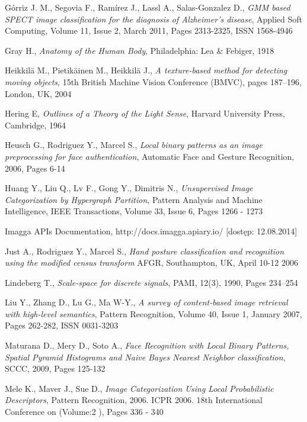 \begin{thebibliography}{100}
 Górriz J. M., Segovia F., Ramírez J., Lassl A., Salas-Gonzalez D., \emph{GMM based SPECT image classification for the diagnosis of Alzheimer’s disease}, Applied Soft Computing, Volume 11, Issue 2, March 2011, Pages 2313-2325, ISSN 1568-4946

 Gray H., \emph{Anatomy of the Human Body}, Philadelphia: Lea \& Febiger, 1918 

 Heikkilä M., Pietikäinen M., Heikkilä J., \emph{A texture-based method for detecting moving objects}, 15th British Machine Vision Conference (BMVC), pages 187–196, London, UK, 2004


 Hering E, \emph{Outlines of a Theory of the Light Sense}, Harvard University Press, Cambridge, 1964

 Heusch G., Rodriguez Y., Marcel S., \emph{Local binary patterns as an image preprocessing for face authentication}, Automatic Face and Gesture Recognition, 2006, Pages 6-14

 Huang Y., Liu Q., Lv F., Gong Y., Dimitris N., \emph{Unsupervised Image Categorization by Hypergraph Partition}, Pattern Analysis and Machine Intelligence, IEEE Transactions, Volume 33, Issue 6, Pages 1266 - 1273

 Imagga APIs Documentation, http://docs.imagga.apiary.io/ [dostęp: 12.08.2014]

 Just A., Rodriguez Y., Marcel S., \emph{Hand posture classification and recognition using the modified census transform} AFGR, Southampton, UK, April 10-12 2006

 Lindeberg T., \emph{Scale-space for discrete signals}, PAMI, 12(3), 1990, Pages 234–254

 Liu Y., Zhang D., Lu G., Ma W-Y., \emph{A survey of content-based image retrieval with high-level semantics}, Pattern Recognition, Volume 40, Issue 1, January 2007, Pages 262-282, ISSN 0031-3203

 Maturana D., Mery D., Soto A., \emph{Face Recognition with Local Binary Patterns, Spatial Pyramid Histograms and Naive Bayes Nearest Neighbor classification}, SCCC, 2009, Pages 125-132

 Mele K., Maver J., Sue D., \emph{Image Categorization Using Local Probabilistic Descriptors}, Pattern Recognition, 2006. ICPR 2006. 18th International Conference on  (Volume:2 ), Pages 336 - 340


\end{thebibliography}
